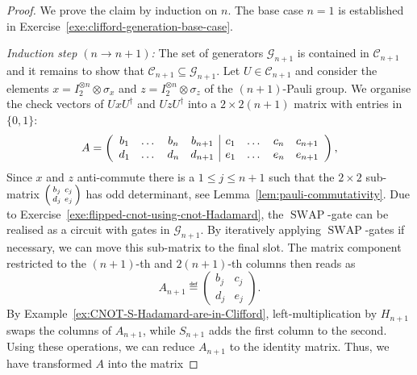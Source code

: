 \documentclass[a4paper, oneside, 12pt]{amsart}
\DeclareMathOperator{\SWAP}{SWAP}
\begin{document}
\begin{proof}
  We prove the claim by induction on \(n\). The base case \(n=1\) is established in Exercise~\ref{exe:clifford-generation-base-case}.

  \textit{Induction step \(( n \to n+1)\):}
  The set of generators \(\mathcal{G}_{n+1}\) is contained in \( \mathcal{C}_{n+1}\) and it remains to show that  \(\mathcal{C}_{n+1} \subseteq \mathcal{G}_{n+1}\).
  Let \(U \in \mathcal{C}_{n+1}\) and consider the elements \(x = I_{2}^{\otimes n} \otimes \sigma_{x}\) and \(z = I_{2}^{\otimes n} \otimes \sigma_{z}\) of the \((n+1)\)-Pauli group.
  We organise the check vectors of \(U x U^{\dagger}\) and \(U z U^{\dagger}\) into a \(2\times 2(n+1)\) matrix with entries in \(\{0,1\}\):
  \begin{equation*}
    A=\left(
      \begin{array}{c c c c| c c c c}
        b_{1} & \dots & b_{n} & b_{n+1} & c_{1} & \dots & c_{n} & c_{n+1} \\
        d_{1} & \dots & d_{n} & d_{n+1} & e_{1} & \dots & e_{n} & e_{n+1}
      \end{array}
    \right),
  \end{equation*}
  Since \(x\) and \(z\) anti-commute there is a \(1\leq j \leq n+1\) such  that the \(2 \times 2\) sub-matrix \(
  \begin{psmallmatrix}
    b_{j} & c_{j} \\ d_{j} & e_{j}
  \end{psmallmatrix}
  \) has odd determinant, see Lemma~\ref{lem:pauli-commutativity}.
  Due to Exercise~\ref{exe:flipped-cnot-using-cnot-Hadamard}, the \(\SWAP\)-gate can be realised as a circuit with gates in \(\mathcal{G}_{n+1}\).
  By iteratively applying \(\SWAP\)-gates if necessary, we can move this sub-matrix to the final slot.
  The matrix component restricted to the \((n+1)\)-th and \(2(n+1)\)-th columns then reads as
  \begin{equation*}
    A_{n+1} \eqdef
    \begin{pmatrix}
      b_{j} & c_{j}\\
      d_{j} & e_{j}
    \end{pmatrix}.
  \end{equation*}
  By Example~\ref{ex:CNOT-S-Hadamard-are-in-Clifford}, left-multiplication by \(H_{n+1}\) swaps the columns of \(A_{n+1}\), while \(S_{n+1}\) adds the first column to the second.
  Using these operations, we can reduce \(A_{n+1}\) to the identity matrix.
  Thus, we have transformed \(A\) into the matrix

\end{proof}
\end{document}
